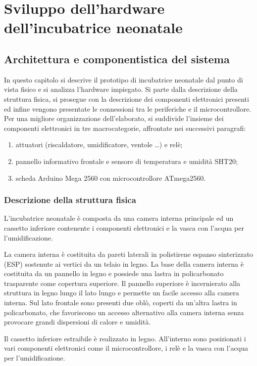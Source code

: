 \chapter{Sviluppo dell'hardware dell'incubatrice neonatale}
\section{Architettura e componentistica del sistema}
In questo capitolo si descrive il prototipo di incubatrice neonatale dal punto di vista fisico e si analizza l'hardware
impiegato. Si parte dalla descrizione della struttura fisica, si prosegue con la descrizione dei componenti elettronici
presenti ed infine vengono presentate le connessioni tra le periferiche e il microcontrollore. Per una migliore organizzazione
dell'elaborato, si suddivide l'insieme dei componenti elettronici in tre macrocategorie, affrontate nei successivi paragrafi:
\begin{enumerate}
	\item attuatori (riscaldatore, umidificatore, ventole \dots) e relè;
	\item pannello informativo frontale e sensore di temperatura e umidità SHT20;
	\item scheda Arduino Mega 2560 con microcontrollore ATmega2560.
\end{enumerate}

\subsection{Descrizione della struttura fisica}
L'incubatrice neonatale è composta da una camera interna principale ed un cassetto inferiore contenente i componenti
elettronici e la vasca con l'acqua per l'umidificazione.

La camera interna è costituita da pareti laterali in polistirene espanso sinterizzato (ESP) sostenute ai vertici da un
telaio in legno. La base della camera interna è costituita da un pannello in legno e possiede una lastra in policarbonato
trasparente come copertura superiore. Il pannello superiore è incernierato alla struttura in legno lungo il lato lungo e
permette un facile accesso alla camera interna. Sul lato frontale sono presenti due oblò, coperti da un'altra lastra in
policarbonato, che favoriscono un accesso alternativo alla camera interna senza provocare grandi dispersioni di calore e
umidità.

Il cassetto inferiore estraibile è realizzato in legno. All'interno sono posizionati i vari componenti elettronici come
il microcontrollore, i relè e la vasca con l'acqua per l'umidificazione.

